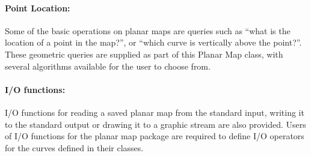 % 
%

\paragraph{Point Location:}

Some of the basic operations on planar maps are queries such as ``what is the location of a point in the map?'', or ``which curve is vertically above the point?''.
These geometric queries are supplied as part of this Planar Map class, with 
several algorithms available for the user to choose from.

\paragraph{I/O functions:}
I/O functions for reading a saved planar map from the standard input, 
writing it to the standard output or drawing it to a graphic stream are also provided.
Users of I/O functions for the planar map package are required to define I/O 
operators for the curves defined in their  classes.


